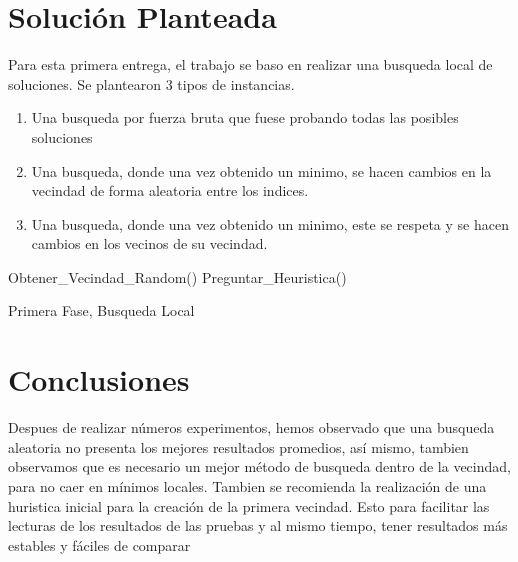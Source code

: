 \documentclass{ci5652}
\begin{document}
\section{Solución Planteada }
Para esta primera entrega, el trabajo se baso en realizar una busqueda local de soluciones. Se plantearon 3 tipos de instancias.
\begin{enumerate}
\item Una busqueda por fuerza bruta que fuese probando todas las posibles soluciones
\item Una busqueda, donde una vez obtenido un minimo, se hacen cambios en la vecindad de forma aleatoria entre los indices.
\item Una busqueda, donde una vez obtenido un minimo, este se respeta y se hacen cambios en los vecinos de su vecindad.
\end{enumerate}

\begin{algorithm}
 \DontPrintSemicolon
 \vspace*{0.1cm}
 Obtener\_Vecindad\_Random()\;
 Preguntar\_Heuristica()\;
 
 \vspace*{0.1cm}
 \caption{Primera Fase, Busqueda Local}
\end{algorithm}


\section{Conclusiones}
Despues de realizar números experimentos, hemos observado que una busqueda aleatoria no presenta los mejores resultados promedios, así mismo, tambien observamos que es necesario un mejor método de busqueda dentro de la vecindad, para no caer en mínimos locales. Tambien se recomienda la realización de una huristica inicial para la creación de la primera vecindad. Esto para facilitar las lecturas de los resultados de las pruebas y al mismo tiempo, tener resultados más estables y fáciles de comparar



\small

\end{document}
